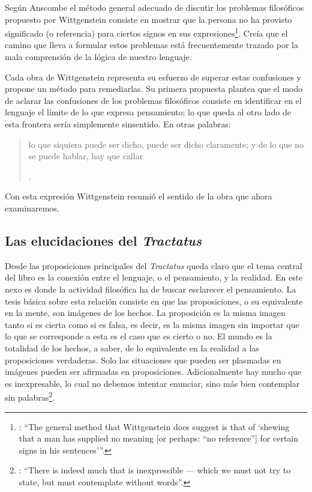 Según Anscombe el método general adecuado de discutir los problemas filosóficos propuesto por Wittgenstein consiste en mostrar que la persona no ha provisto significado (o referencia) para ciertos signos en sus expresiones\footnote{\cite[Cf.][151]{anscombe1959iwt}: \enquote{The general method that Wittgenstein does suggest is that of `shewing that a man has supplied no meaning [or perhaps: ``no reference''] for certain signs in his sentences'}.}. Creía que el camino que lleva a formular estos problemas está frecuentemente trazado por la mala comprensión de la lógica de nuestro lenguaje.

Cada obra de Wittgenstein representa su esfuerzo de superar estas confusiones y propone un método para remediarlas. Su primera propuesta plantea que el modo de aclarar las confusiones de los problemas filosóficos consiste en identificar en el lenguaje el límite de lo que expresa pensamiento; lo que queda al otro lado de esta frontera sería simplemente sinsentido. En otras palabras: \blockquote[{\Cite[11]{wittgenstein1922tractatuses}}.]{lo que siquiera puede ser dicho, puede ser dicho claramente; y de lo que no se puede hablar, hay que callar}. Con esta expresión Wittgenstein resumió el sentido de la obra que ahora examinaremos.

\subsection{Las elucidaciones del \emph{Tractatus}}
Desde las proposiciones principales del \emph{Tractatus} queda claro que el tema central del libro es la conexión entre el lenguaje, o el pensamiento, y la realidad.
En este nexo es donde la actividad filosófica ha de buscar esclarecer el pensamiento.
La tesis básica sobre esta relación consiste en que las proposiciones, o su equivalente en la mente, son imágenes de los hechos.
La proposición es la misma imagen tanto si es cierta como si es falsa, es decir, es la misma imagen sin importar que lo que se corresponde a esta es el caso que es cierto o no. El mundo es la totalidad de los hechos, a saber, de lo equivalente en la realidad a las proposiciones verdaderas.
Solo las situaciones que pueden ser plasmadas en imágenes pueden ser afirmadas en proposiciones. Adicionalmente hay mucho que es inexpresable, lo cual no debemos intentar enunciar, sino más bien contemplar sin palabras\footnote{\cite[Cf.][19]{anscombe1959iwt}: \enquote{There is indeed much that is inexpressible --- which we must not try to state, but must contemplate without words}.}.

